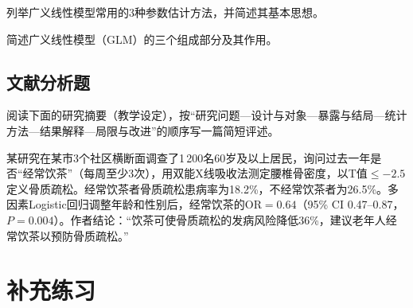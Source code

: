 \par\addvspace{8pt}\noindent\begin{minipage}{\linewidth}


列举广义线性模型常用的3种参数估计方法，并简述其基本思想。



\end{minipage}\par\vspace{5pt}

\par\addvspace{8pt}\noindent\begin{minipage}{\linewidth}


简述广义线性模型（GLM）的三个组成部分及其作用。



\end{minipage}\par\vspace{5pt}

\par\addvspace{8pt}\noindent\begin{minipage}{\linewidth}

\subsection{文献分析题}


阅读下面的研究摘要（教学设定），按``研究问题---设计与对象---暴露与结局---统计方法---结果解释---局限与改进''的顺序写一篇简短评述。

某研究在某市3个社区横断面调查了1\,200名60岁及以上居民，询问过去一年是否``经常饮茶''（每周至少3次），用双能X线吸收法测定腰椎骨密度，以T值\(\le-2.5\)定义骨质疏松。经常饮茶者骨质疏松患病率为18.2\%，不经常饮茶者为26.5\%。多因素Logistic回归调整年龄和性别后，经常饮茶的\(\mathrm{OR}=0.64\)（95\% CI 0.47--0.87，\(P=0.004\)）。作者结论：``饮茶可使骨质疏松的发病风险降低36\%，建议老年人经常饮茶以预防骨质疏松。''


\end{minipage}\par\vspace{5pt}


\clearpage\section{补充练习}

